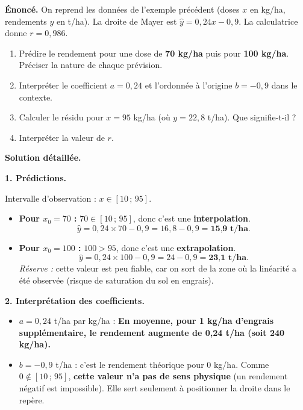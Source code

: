\documentclass[11pt]{article}
\begin{document}
\begin{exoresolu}
\textbf{Énoncé.} On reprend les données de l'exemple précédent (doses $x$ en kg/ha, rendements $y$ en t/ha). La droite de Mayer est $\hat{y} = 0,24x - 0,9$. La calculatrice donne $r = 0,986$.

\begin{enumerate}
    \item Prédire le rendement pour une dose de \textbf{70 kg/ha} puis pour \textbf{100 kg/ha}. Préciser la nature de chaque prévision.
    \item Interpréter le coefficient $a = 0,24$ et l'ordonnée à l'origine $b = -0,9$ dans le contexte.
    \item Calculer le résidu pour $x = 95$ kg/ha (où $y = 22,8$ t/ha). Que signifie-t-il ?
    \item Interpréter la valeur de $r$.
\end{enumerate}

\tcblower

\textbf{Solution détaillée.}

\textbf{1. Prédictions.}

Intervalle d'observation : $x \in [10\,;\,95]$.
\begin{itemize}
    \item \textbf{Pour $x_0 = 70$ :} $70 \in [10\,;\,95]$, donc c'est une \textbf{interpolation}.
    \[ \hat{y} = 0,24 \times 70 - 0,9 = 16,8 - 0,9 = \textbf{15,9 t/ha}. \]
    \item \textbf{Pour $x_0 = 100$ :} $100 > 95$, donc c'est une \textbf{extrapolation}.
    \[ \hat{y} = 0,24 \times 100 - 0,9 = 24 - 0,9 = \textbf{23,1 t/ha}. \]
    \emph{Réserve :} cette valeur est peu fiable, car on sort de la zone où la linéarité a été observée (risque de saturation du sol en engrais).
\end{itemize}

\textbf{2. Interprétation des coefficients.}
\begin{itemize}
    \item $a = 0,24$ t/ha par kg/ha : \og \textbf{En moyenne, pour 1 kg/ha d'engrais supplémentaire, le rendement augmente de 0,24 t/ha (soit 240 kg/ha).} \fg{}
    \item $b = -0,9$ t/ha : c'est le rendement théorique pour 0 kg/ha. Comme $0 \notin [10\,;\,95]$, \textbf{cette valeur n'a pas de sens physique} (un rendement négatif est impossible). Elle sert seulement à positionner la droite dans le repère.
\end{itemize}


\end{exoresolu}
\end{document}
